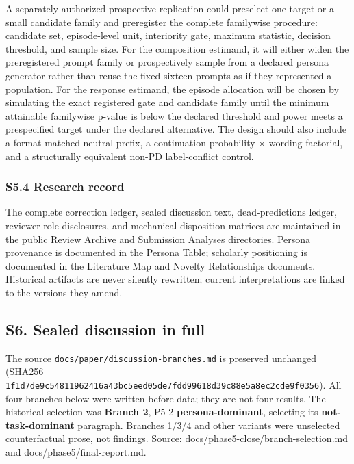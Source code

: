 \documentclass[11pt]{article}
\begin{document}
A separately authorized prospective replication could preselect one
target or a small candidate family and preregister the complete
familywise procedure: candidate set, episode-level unit, interiority
gate, maximum statistic, decision threshold, and sample size. For the
composition estimand, it will either widen the preregistered prompt
family or prospectively sample from a declared persona generator rather
than reuse the fixed sixteen prompts as if they represented a
population. For the response estimand, the episode allocation will be
chosen by simulating the exact registered gate and candidate family
until the minimum attainable familywise p-value is below the declared
threshold and power meets a prespecified target under the declared
alternative. The design should also include a format-matched neutral
prefix, a continuation-probability × wording factorial, and a
structurally equivalent non-PD label-conflict control.

\subsubsection{S5.4 Research record}\label{s5.4-research-record}

The complete correction ledger, sealed discussion text, dead-predictions
ledger, reviewer-role disclosures, and mechanical disposition matrices
are maintained in the public Review Archive and Submission Analyses
directories. Persona provenance is documented in the Persona Table;
scholarly positioning is documented in the Literature Map and Novelty
Relationships documents. Historical artifacts are never silently
rewritten; current interpretations are linked to the versions they
amend.

\subsection{S6. Sealed discussion in
full}\label{s6.-sealed-discussion-in-full}

The source \texttt{docs/paper/discussion-branches.md} is preserved
unchanged (SHA256
\nolinkurl{1f1d7de9c54811962416a43bc5eed05de7fdd99618d39c88e5a8ec2cde9f0356}).
All four branches below were written before data; they are not four
results. The historical selection was \textbf{Branch 2}, P5-2
\textbf{persona-dominant}, selecting its \textbf{not-task-dominant}
paragraph. Branches 1/3/4 and other variants were unselected
counterfactual prose, not findings. Source:
docs/phase5-close/branch-selection.md and docs/phase5/final-report.md.
\end{document}
